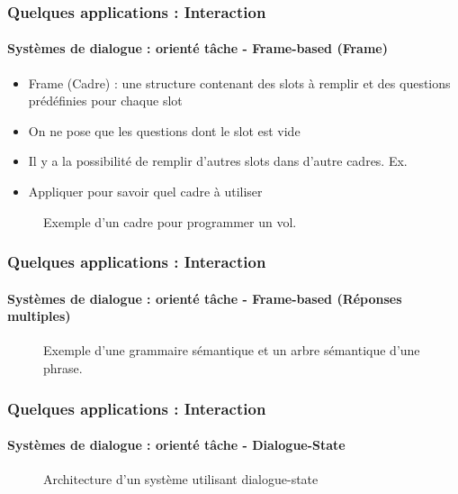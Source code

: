 \documentclass[xcolor=table]{beamer}
\begin{document}
\begin{frame}
	\frametitle{Quelques applications : Interaction}
	\framesubtitle{Systèmes de dialogue : orienté tâche - Frame-based (Frame)}
	
	\begin{itemize}
		\item Frame (Cadre) : une structure contenant des slots à remplir et des questions prédéfinies pour chaque slot
		\item On ne pose que les questions dont le slot est vide
		\item Il y a la possibilité de remplir d'autres slots dans d'autre cadres. 
		Ex. 
		\item Appliquer  pour savoir quel cadre à utiliser
	\end{itemize}
	
	\begin{figure}
		\centering
		\caption{Exemple d'un cadre pour programmer un vol. \cite{2020-jurafsky-martin}}
	\end{figure}
	
\end{frame}

\begin{frame}
	\frametitle{Quelques applications : Interaction}
	\framesubtitle{Systèmes de dialogue : orienté tâche - Frame-based (Réponses multiples)}
	
	\begin{figure}
		\centering
		
		\caption{Exemple d'une grammaire sémantique et un arbre sémantique d'une phrase. \cite{2020-jurafsky-martin}}
	\end{figure}
	
\end{frame}

\begin{frame}
	\frametitle{Quelques applications : Interaction}
	\framesubtitle{Systèmes de dialogue : orienté tâche - Dialogue-State}
	
	\begin{figure}
		\centering
		\caption{Architecture d'un système utilisant dialogue-state \cite{2016-williams-al}}
	\end{figure}
	
\end{frame}
\end{document}
